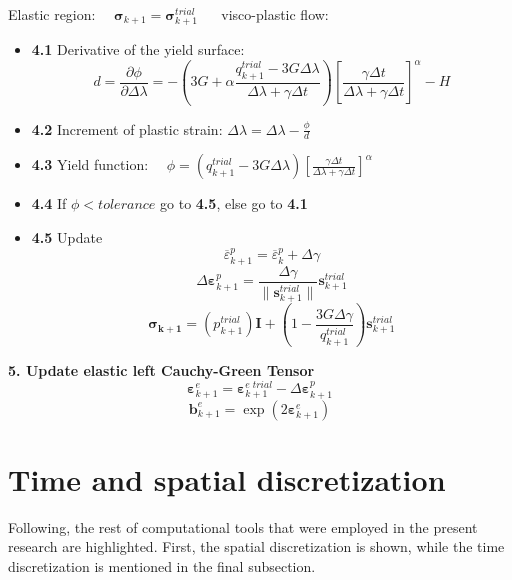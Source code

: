\documentclass[applsci,journal,article,submit,moreauthors,pdftex]{Definitions/mdpi}
\begin{document}
\begin{algorithm}
\begin{algorithmic}
 Elastic region: $\quad \boldsymbol{\sigma}_{k+1}=\boldsymbol{\sigma}^{trial}_{k+1}$
\vspace{0.3cm}
\ELSE    $\quad$  visco-plastic flow:
\begin{itemize}
\item\textbf{4.1} Derivative of the yield surface:
\begin{equation}
d=\frac{\partial\phi}{\partial\Delta\lambda} = - \left( 3G  + \alpha \frac{q^{trial}_{k+1}  - 3G\Delta\lambda}{\Delta \lambda + \gamma\Delta t}\right) \left[  \frac{\gamma \Delta t}{\Delta \lambda+\gamma \Delta  t} \right]^{\alpha}  - H \nonumber
\end{equation}
\item\textbf{4.2} Increment of plastic strain:
$
\Delta\lambda=\Delta\lambda-\frac{\phi}{d}
$\vspace{0.3cm}
\item\textbf{4.3} Yield function:
$
\quad \phi= \left(q^{trial}_{k+1}  - 3G\Delta\lambda\right) \left[  \frac{\gamma \Delta t}{\Delta \lambda+\gamma \Delta  t} \right]^{\alpha} 
$\vspace{0.3cm}
\item\textbf{4.4} If $\phi < tolerance$ go to \textbf{4.5}, else go to  \textbf{4.1}
\item\textbf{4.5} Update
$$
\overline{\varepsilon}^p_{k+1}=\overline{\varepsilon}^p_{k}+\Delta\gamma
$$
$$
\Delta\boldsymbol{\varepsilon}_{k+1}^{p}= \frac{\Delta\gamma}{\|\textbf{s}^{trial}_{k+1}\|}\mathbf{s}^{trial}_{k+1}
$$
$$
\boldsymbol{\sigma_{k+1}}=\left(p^{trial}_{k+1} \right)\mathbf{I}+\left(1-\frac{3G\Delta\gamma}{q^{trial}_{k+1} }\right)\textbf{s}^{trial}_{k+1}
$$
\end{itemize}
\ENDIF\vspace{0.3cm}
%
\State \textbf{5. Update elastic left Cauchy-Green Tensor}
$$
\boldsymbol{\varepsilon}_{k+1}^{e}= \boldsymbol{\varepsilon}^{e\; trial}_{k+1}-\Delta\boldsymbol{\varepsilon}_{k+1}^{p}
$$
$$
\mathbf{b}_{k+1}^{e}=\exp (2 \boldsymbol{\varepsilon}_{k+1}^{e})
$$
\end{algorithmic}
\end{algorithm}

\section{Time and spatial discretization}
Following, the rest of computational tools that were employed in the present research are highlighted. First, the spatial discretization is shown, while the time discretization is mentioned in the final subsection.
\end{document}
